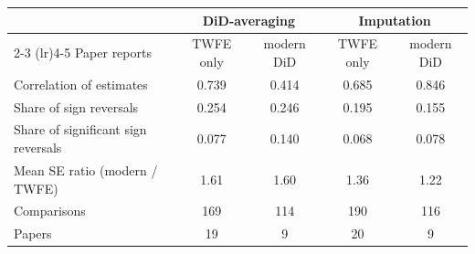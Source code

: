 \begin{tabular}{lcccc}
\toprule
 & \multicolumn{2}{c}{DiD-averaging} & \multicolumn{2}{c}{Imputation} \\
\cmidrule(lr){2-3} \cmidrule(lr){4-5}
Paper reports & TWFE only & modern DiD & TWFE only & modern DiD \\
\midrule
Correlation of estimates & 0.739 & 0.414 & 0.685 & 0.846 \\
Share of sign reversals & 0.254 & 0.246 & 0.195 & 0.155 \\
Share of significant sign reversals & 0.077 & 0.140 & 0.068 & 0.078 \\
Mean SE ratio (modern / TWFE) & 1.61 & 1.60 & 1.36 & 1.22 \\
\midrule
Comparisons & 169 & 114 & 190 & 116 \\
Papers & 19 & 9 & 20 & 9 \\
\bottomrule
\end{tabular}
